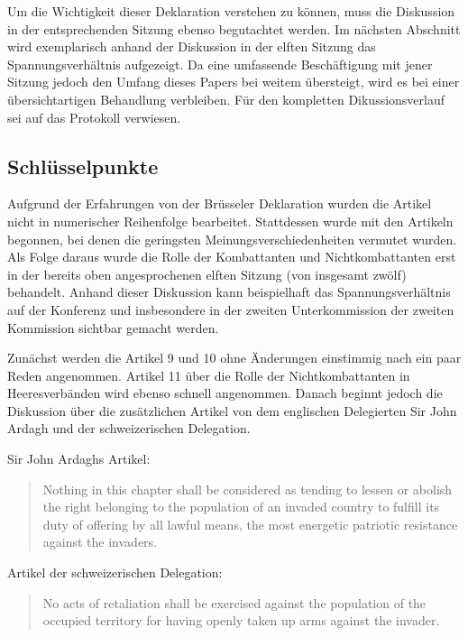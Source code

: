 \documentclass[12pt]{scrartcl}
\begin{document}
Um die Wichtigkeit dieser Deklaration verstehen zu können, muss die Diskussion in der entsprechenden Sitzung ebenso begutachtet werden. Im nächsten Abschnitt wird exemplarisch anhand der Diskussion in der elften Sitzung das Spannungsverhältnis aufgezeigt. Da eine umfassende Beschäftigung mit jener Sitzung jedoch den Umfang dieses Papers bei weitem übersteigt, wird es bei einer übersichtartigen Behandlung verbleiben. Für den kompletten Dikussionsverlauf sei auf das Protokoll verwiesen.

\subsection{Schlüsselpunkte}

Aufgrund der Erfahrungen von der Brüsseler Deklaration wurden die Artikel nicht in numerischer Reihenfolge bearbeitet. Stattdessen wurde mit den Artikeln begonnen, bei denen die geringsten Meinungsverschiedenheiten vermutet wurden. Als Folge daraus wurde die Rolle der Kombattanten und Nichtkombattanten erst in der bereits oben angesprochenen elften Sitzung (von insgesamt zwölf) behandelt. Anhand dieser Diskussion kann beispielhaft das Spannungsverhältnis auf der Konferenz und insbesondere in der zweiten Unterkommission der zweiten Kommission sichtbar gemacht werden.

Zunächst werden die Artikel 9 und 10 ohne Änderungen einstimmig nach ein paar Reden angenommen. Artikel 11 über die Rolle der Nichtkombattanten in Heeresverbänden wird ebenso schnell angenommen. Danach beginnt jedoch die Diskussion über die zusätzlichen Artikel von dem englischen Delegierten Sir John Ardagh und der schweizerischen Delegation.

Sir John Ardaghs Artikel:
\begin{quotation}
	Nothing in this chapter shall be considered as tending to lessen or abolish 
the right belonging to the population of an invaded country to fulfill its
duty of offering by all lawful means, the most energetic patriotic resistance
against the invaders.
\end{quotation}

Artikel der schweizerischen Delegation:
\begin{quotation}
	No acts of retaliation shall be exercised against the population of the
occupied territory for having openly taken up arms against the invader.
\end{quotation}
\end{document}
